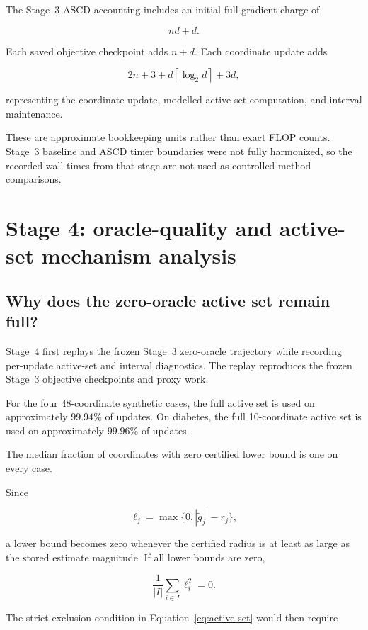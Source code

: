 \documentclass[11pt]{article}
\begin{document}
The Stage~3 ASCD accounting includes an initial full-gradient charge of

\[
nd+d.
\]

Each saved objective checkpoint adds $n+d$. Each coordinate update adds

\[
2n+3
+
d\left\lceil\log_2d\right\rceil
+
3d,
\]

representing the coordinate update, modelled active-set computation, and
interval maintenance.

These are approximate bookkeeping units rather than exact FLOP counts.
Stage~3 baseline and ASCD timer boundaries were not fully harmonized, so
the recorded wall times from that stage are not used as controlled
method comparisons.


\section{Stage 4: oracle-quality and active-set mechanism analysis}

\subsection{Why does the zero-oracle active set remain full?}

Stage~4 first replays the frozen Stage~3 zero-oracle trajectory while
recording per-update active-set and interval diagnostics. The replay
reproduces the frozen Stage~3 objective checkpoints and proxy work.

For the four 48-coordinate synthetic cases, the full active set is used
on approximately $99.94\%$ of updates. On diabetes, the full
10-coordinate active set is used on approximately $99.96\%$ of updates.

The median fraction of coordinates with zero certified lower bound is
one on every case.

Since

\[
\ell_j
=
\max\{0,|\widetilde g_j|-r_j\},
\]

a lower bound becomes zero whenever the certified radius is at least as
large as the stored estimate magnitude. If all lower bounds are zero,

\[
\frac{1}{|I|}
\sum_{i\in I}\ell_i^2
=
0.
\]

The strict exclusion condition in
Equation~\eqref{eq:active-set} would then require
\end{document}
